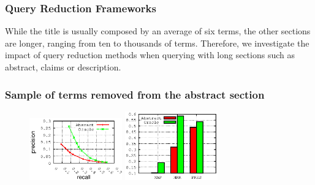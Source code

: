 \documentclass[xcolor=dvipsnames]{beamer}
\begin{document}
\begin{frame}
\frametitle{Query Reduction Frameworks }

While the title is usually composed by an average of six terms, the
other sections are longer, ranging from ten to thousands of terms.
Therefore, we investigate the impact of query reduction methods when
querying with long sections such as abstract, claims or description.

\end{frame}



\begin{frame}
\frametitle{Sample of terms removed from the abstract section}

\begin{figure}
\begin{center}
\includegraphics[width=4cm]{../analysis/precision-recall_ByField-CLEF-IP_2010}
\includegraphics[width=4cm]{../analysis/MAP-MRR_ByField-CLEF-IP_2010}
\end{center}
\end{figure}

\end{frame}
\end{document}
